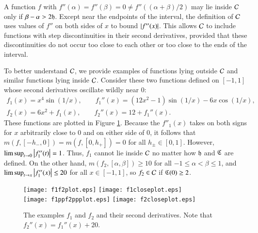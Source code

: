 \documentclass[review]{elsarticle}
\begin{document}
A function $f$ with $f''(\alpha) = f''(\beta) = 0 \ne f''((\alpha+\beta)/2)$ may
lie inside $\mathcal{C}$ only if $\beta - \alpha > 2\mathfrak{h}$. Except near the endpoints of
the interval, the definition of $\mathcal{C}$ uses values of $f''$ on both sides of $x$
to bound $\left \lvert f''(x) \right \rvert$. This allows $\mathcal{C}$ to include functions with step
discontinuities in their second derivatives, provided that these discontinuities
do not occur too close to each other or too close to the ends of the interval.

To better understand $\mathcal{C}$, we provide examples of functions lying outside $\mathcal{C}$
and similar functions lying inside $\mathcal{C}$. Consider these two functions defined
on $[-1,1]$ whose second derivatives oscillate wildly near $0$:
\begin{gather*}
f_1(x) = x^4 \sin(1/x), \qquad f_1''(x) = (12x^2 - 1) \sin(1/x) -6 x \cos(1/x), \\
f_2(x) = 6 x^2 + f_1(x), \qquad f_2''(x) = 12 + f_1''(x).
\end{gather*}
These functions are plotted in Figure \ref{f1f2fig}. Because the $f''_1(x)$
takes on both signs for $x$ arbitrarily close to $0$ and on either side of $0$,
it follows that $m(f,[-h_-,0]) = m(f,[0,h_+]) = 0$ for all $h_\pm \in [0,1]$.
However, $\limsup_{t \to 0} \left \lvert f''_1(t) \right \rvert = 1$. Thus, $f_1$ cannot lie inside
$\mathcal{C}$ no matter how $\mathfrak{h}$ and $\mathfrak{C}$ are defined. On the other hand,
$m(f_2,[\alpha, \beta]) \ge 10$ for all $-1 \le \alpha < \beta \le 1$, and
$\limsup_{t \to x} \left \lvert f''_1(x) \right \rvert \le 20$ for all $x \in [-1,1]$, so $f_2 \in
\mathcal{C}$ if $\mathfrak{C}(0) \ge 2$.

\begin{figure}[t]
\centering
\texttt{[image: f1f2plot.eps]} \qquad
\texttt{[image: f1closeplot.eps]} \\
\texttt{[image: f1ppf2ppplot.eps]} \qquad
\texttt{[image: f2closeplot.eps]}
\caption{The examples $f_1$ and $f_2$ and their second derivatives. Note that
$f_2''(x) = f_1''(x) + 20$. \label{f1f2fig}}
\end{figure}
\end{document}
